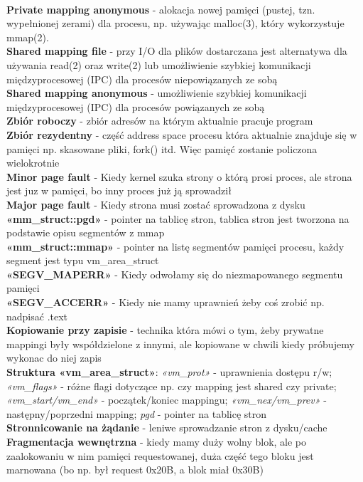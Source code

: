 \documentclass{article}
\begin{document}
\\ \textbf{Private mapping anonymous} - alokacja nowej pamięci (pustej, tzn. wypełnionej zerami) dla procesu, np. używając malloc(3), który wykorzystuje mmap(2).
\\ \textbf{Shared mapping file} - przy I/O dla plików dostarczana jest alternatywa dla używania read(2) oraz write(2) lub umożliwienie szybkiej komunikacji międzyprocesowej (IPC) dla procesów niepowiązanych ze sobą
\\ \textbf{Shared mapping anonymous} - umożliwienie szybkiej komunikacji międzyprocesowej (IPC) dla procesów powiązanych ze sobą
\\ \textbf{Zbiór roboczy} - zbiór adresów na którym aktualnie pracuje program
\\ \textbf{Zbiór rezydentny} - część address space procesu która aktualnie znajduje się w pamięci np. skasowane pliki, fork() itd. Więc pamięć zostanie policzona wielokrotnie
\\ \textbf{Minor page fault} - Kiedy kernel szuka strony o którą prosi proces, ale strona jest juz w pamięci, bo inny proces już ją sprowadził
\\ \textbf{Major page fault} - Kiedy strona musi zostać sprowadzona z dysku
\\ \textbf{«mm\_struct::pgd»} - pointer na tablicę stron, tablica stron jest tworzona na podstawie opisu segmentów z mmap
\\ \textbf{«mm\_struct::mmap»} - pointer na listę segmentów pamięci procesu, każdy segment jest typu vm\_area\_struct
\\ \textbf{«SEGV\_MAPERR»} - Kiedy odwołamy się do niezmapowanego segmentu pamięci
\\ \textbf{«SEGV\_ACCERR»} - Kiedy nie mamy uprawnień żeby coś zrobić np. nadpisać .text
\\ \textbf{Kopiowanie przy zapisie} - technika która mówi o tym, żeby prywatne mappingi były współdzielone z innymi, ale kopiowane w chwili kiedy próbujemy wykonac do niej zapis
\\ \textbf{Struktura «vm\_area\_struct»}: \textit{«vm\_prot»} - uprawnienia dostępu r/w; \textit{«vm\_flags»} - różne flagi dotyczące np. czy mapping jest shared czy private; \textit{«vm\_start/vm\_end»} - początek/koniec mappingu; \textit{«vm\_nex/vm\_prev»} - następny/poprzedni mapping; \textit{pgd} - pointer na tablicę stron
\\ \textbf{Stronnicowanie na żądanie} - leniwe sprowadzanie stron z dysku/cache
\\ \textbf{Fragmentacja wewnętrzna} - kiedy mamy duży wolny blok, ale po zaalokowaniu w nim pamięci requestowanej, duża część tego bloku jest marnowana (bo np. był request 0x20B, a blok miał 0x30B)
\end{document}
